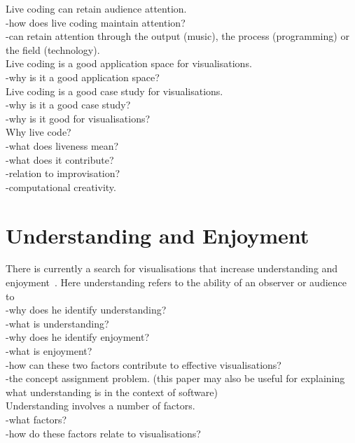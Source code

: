 Live coding can retain audience attention.\\
-how does live coding maintain attention?\\
-can retain attention through the output (music), the process (programming) or the field (technology).\\


Live coding is a good application space for visualisations.\\
-why is it a good application space?\\

Live coding is a good case study for visualisations.\\
-why is it a good case study?\\
-why is it good for visualisations?\\

Why live code?\\
-what does liveness mean? \cite{Auslander}\\
-what does it contribute?\\
-relation to improvisation?\\
-computational creativity. \cite{Mclean}\\


\section{Understanding and Enjoyment}

There is currently a search for visualisations that increase understanding and enjoyment~\cite{McLean2010a}. Here understanding refers to the ability of an observer or audience to \\
-why does he identify understanding?\\
-what is understanding?\\
-why does he identify enjoyment?\\
-what is enjoyment?\\
-how can these two factors contribute to effective visualisations?\\
-the concept assignment problem. \cite{Biggerstaff1994} (this paper may also be useful for explaining what understanding is in the context of software)\\

Understanding involves a number of factors.\\
-what factors?\\
-how do these factors relate to visualisations?\\

